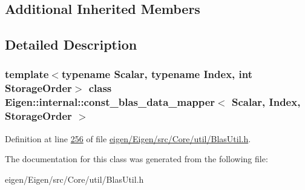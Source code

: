 \subsection*{Additional Inherited Members}


\subsection{Detailed Description}
\subsubsection*{template$<$typename Scalar, typename Index, int Storage\+Order$>$\newline
class Eigen\+::internal\+::const\+\_\+blas\+\_\+data\+\_\+mapper$<$ Scalar, Index, Storage\+Order $>$}



Definition at line \hyperlink{eigen_2_eigen_2src_2_core_2util_2_blas_util_8h_source_l00256}{256} of file \hyperlink{eigen_2_eigen_2src_2_core_2util_2_blas_util_8h_source}{eigen/\+Eigen/src/\+Core/util/\+Blas\+Util.\+h}.



The documentation for this class was generated from the following file\+:\begin{DoxyCompactItemize}
\item 
eigen/\+Eigen/src/\+Core/util/\+Blas\+Util.\+h\end{DoxyCompactItemize}
